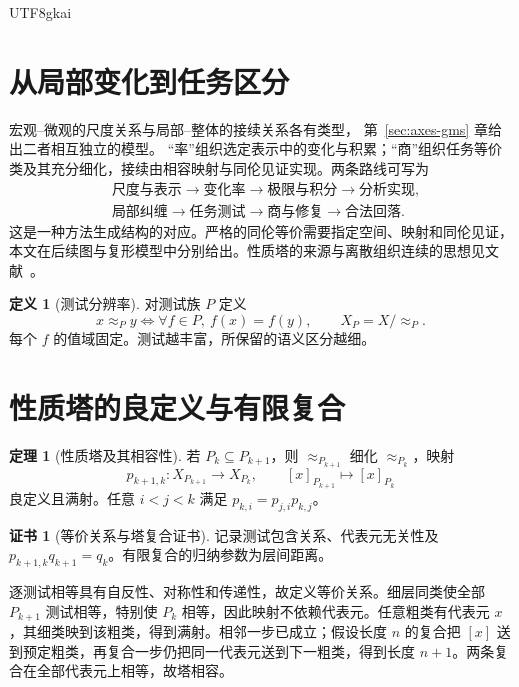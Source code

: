 \documentclass[12pt]{report}
\makeatletter
\theoremstyle{definition}
\newtheorem{definition}{定义}[chapter]
\newtheorem{theorem}{定理}[chapter]
\newtheorem{Certificate}{证书}[chapter]
\renewenvironment{proof}[1][\proofname]{\par
  \pushQED{\qed}\normalfont
  \topsep6\p@\@plus6\p@\relax
  \trivlist
  \item[\hskip\labelsep\normalfont #1\@addpunct{.}]\ignorespaces
}{
  \popQED\endtrivlist\@endpefalse
}
\makeatother
\begin{document}
\begin{CJK*}{UTF8}{gkai}
\section{从局部变化到任务区分}
宏观--微观的尺度关系与局部--整体的接续关系各有类型，
第~\ref{sec:axes-gms} 章给出二者相互独立的模型。
“率”组织选定表示中的变化与积累；“商”组织任务等价类及其充分细化，接续由相容映射与同伦见证实现。两条路线可写为
\[
\begin{aligned}
&\text{尺度与表示}\to\text{变化率}\to\text{极限与积分}\to\text{分析实现},\\
&\text{局部纠缠}\to\text{任务测试}\to\text{商与修复}\to\text{合法回落}.
\end{aligned}
\]
这是一种方法生成结构的对应。严格的同伦等价需要指定空间、映射和同伦见证，本文在后续图与复形模型中分别给出。性质塔的来源与离散组织连续的思想见文献~\cite{propertytower,discrete,layers}。

\begin{definition}[测试分辨率]
对测试族 \(P\) 定义
\[
x\approx_P y\iff \forall f\in P,\ f(x)=f(y),\qquad X_P=X/{\approx_P}.
\]
每个 \(f\) 的值域固定。测试越丰富，所保留的语义区分越细。
\end{definition}

\section{性质塔的良定义与有限复合}
\begin{theorem}[性质塔及其相容性]
\label{thm:tower}
若 \(P_k\subseteq P_{k+1}\)，则 \(\approx_{P_{k+1}}\) 细化 \(\approx_{P_k}\)，映射
\[
p_{k+1,k}:X_{P_{k+1}}\to X_{P_k},\qquad [x]_{P_{k+1}}\mapsto[x]_{P_k}
\]
良定义且满射。任意 \(i<j<k\) 满足 \(p_{k,i}=p_{j,i}p_{k,j}\)。
\end{theorem}
\begin{Certificate}[等价关系与塔复合证书]
记录测试包含关系、代表元无关性及
\(p_{k+1,k}q_{k+1}=q_k\)。有限复合的归纳参数为层间距离。
\end{Certificate}
\begin{proof}
逐测试相等具有自反性、对称性和传递性，故定义等价关系。细层同类使全部 \(P_{k+1}\) 测试相等，特别使 \(P_k\) 相等，因此映射不依赖代表元。任意粗类有代表元 \(x\)，其细类映到该粗类，得到满射。相邻一步已成立；假设长度 \(n\) 的复合把 \([x]\) 送到预定粗类，再复合一步仍把同一代表元送到下一粗类，得到长度 \(n+1\)。两条复合在全部代表元上相等，故塔相容。
\end{proof}


\end{CJK*}
\end{document}
